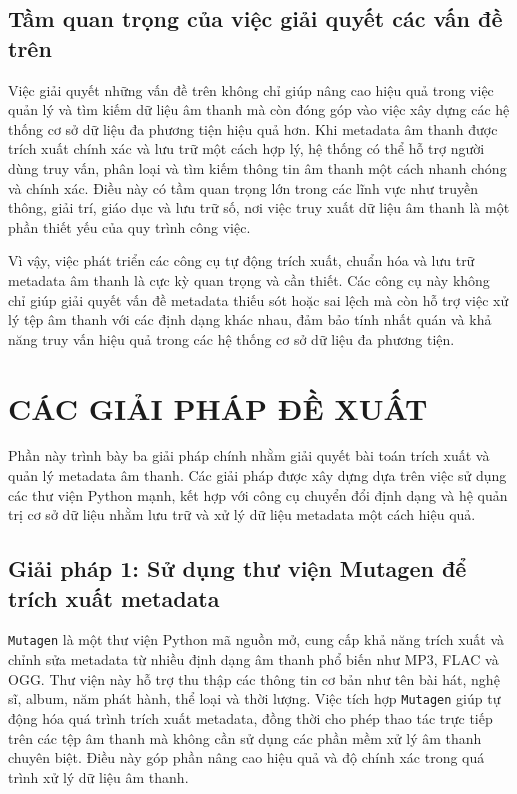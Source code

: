 \documentclass[conference]{IEEEtran}
\begin{document}
\subsection{Tầm quan trọng của việc giải quyết các vấn đề trên}

Việc giải quyết những vấn đề trên không chỉ giúp nâng cao hiệu quả trong việc quản lý và tìm kiếm dữ liệu âm thanh
 mà còn đóng góp vào việc xây dựng các hệ thống cơ sở dữ liệu đa phương tiện hiệu quả hơn.
  Khi metadata âm thanh được trích xuất chính xác và lưu trữ một cách hợp lý, 
  hệ thống có thể hỗ trợ người dùng truy vấn, phân loại và tìm kiếm thông tin âm thanh một cách nhanh chóng và chính xác.
   Điều này có tầm quan trọng lớn trong các lĩnh vực như truyền thông, giải trí,
    giáo dục và lưu trữ số, nơi việc truy xuất dữ liệu âm thanh là một phần thiết yếu của quy trình công việc.

Vì vậy, việc phát triển các công cụ tự động trích xuất, 
chuẩn hóa và lưu trữ metadata âm thanh là cực kỳ quan trọng và cần thiết. 
Các công cụ này không chỉ giúp giải quyết vấn đề metadata thiếu sót hoặc sai lệch mà còn hỗ trợ việc
 xử lý tệp âm thanh với các định dạng khác nhau, đảm bảo tính nhất quán và khả năng truy vấn hiệu quả trong 
 các hệ thống cơ sở dữ liệu đa phương tiện.



\section{CÁC GIẢI PHÁP ĐỀ XUẤT}

Phần này trình bày ba giải pháp chính nhằm giải quyết bài toán trích xuất và quản lý metadata âm thanh.
 Các giải pháp được xây dựng dựa trên việc sử dụng các thư viện Python mạnh,
  kết hợp với công cụ chuyển đổi định dạng và hệ quản trị cơ sở dữ liệu nhằm lưu trữ và xử lý dữ liệu metadata
   một cách hiệu quả.

\subsection{Giải pháp 1: Sử dụng thư viện Mutagen để trích xuất metadata}

\texttt{Mutagen} là một thư viện Python mã nguồn mở, cung cấp khả năng trích xuất và chỉnh sửa metadata
 từ nhiều định dạng âm thanh phổ biến như MP3, FLAC và OGG. 
 Thư viện này hỗ trợ thu thập các thông tin cơ bản như tên bài hát, nghệ sĩ, album, năm phát hành,
  thể loại và thời lượng. Việc tích hợp \texttt{Mutagen} giúp tự động hóa quá trình trích xuất metadata,
   đồng thời cho phép thao tác trực tiếp trên các tệp âm thanh mà không cần sử dụng các phần mềm xử lý âm thanh
    chuyên biệt. Điều này góp phần nâng cao hiệu quả và độ chính xác trong quá trình xử lý dữ liệu âm thanh.
\end{document}
